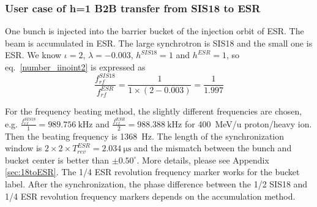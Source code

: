 
\subsubsection{User case of h=1 B2B transfer from SIS18 to ESR} 
One bunch is injected into the barrier bucket of the injection orbit of ESR. The beam is accumulated in ESR. The large synchrotron is SIS18 and the small one is ESR. We know $\iota=2$, $\lambda=-0.003$, $h^{SIS18}=1$ and $h^{ESR}=1$, so eq.~\ref{number_iinoint2} is expressed as
\begin{equation}
\frac {f_{rf}^{SIS18}}{f_{rf}^{ESR}}= \frac {1 }{1 \times( 2- 0.003)}=\frac{1}{1.997}
\end{equation}

For the frequency beating method, the slightly different frequencies are chosen, e.g. $\frac{f_{rf}^{SIS18}}{1}=\SI{989.756}{\kHz}$ and $\frac{f_{rf}^{ESR}}{2}=\SI{988.388}{\kHz}$ for \SI{400}{MeV/\atomicmassunit} proton/heavy ion. Then the beating frequency is \SI{1368}{\Hz}. The length of the synchronization window is $2\times 2 \times T_{rev}^{ESR}= \SI{2.034}{\us}$ and the mismatch between the bunch and bucket center is better than $\pm0.50^\circ$. More details, please see Appendix \ref{sec:18toESR}. The 1/4 ESR revolution frequency marker works for the bucket label. After the synchronization, the phase difference between the 1/2 SIS18 and 1/4 ESR revolution frequency markers depends on the accumulation method.

